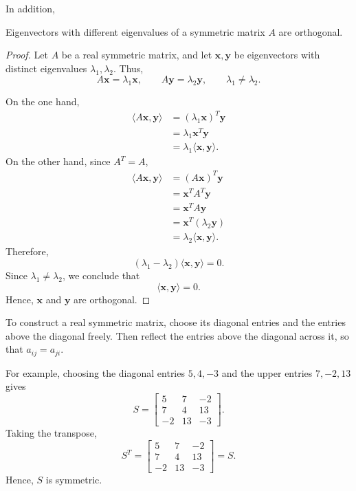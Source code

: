 In addition,

\begin{theorem}
	Eigenvectors with different eigenvalues of a symmetric matrix \( A \) are orthogonal.
\end{theorem}
\begin{proof}
	Let \(A\) be a real symmetric matrix, and let
	\(\mathbf{x},\mathbf{y}\) be eigenvectors with
	distinct eigenvalues \(\lambda_1,\lambda_2\).
	Thus,
	\[
		A\mathbf{x}=\lambda_1\mathbf{x},
		\qquad
		A\mathbf{y}=\lambda_2\mathbf{y},
		\qquad
		\lambda_1\neq\lambda_2.
	\]

	On the one hand,
	\begin{align*}
		\langle A\mathbf{x},\mathbf{y}\rangle
		 & =(\lambda_1\mathbf{x})^T\mathbf{y}             \\
		 & =\lambda_1\mathbf{x}^T\mathbf{y}               \\
		 & =\lambda_1\langle\mathbf{x},\mathbf{y}\rangle.
	\end{align*}
	On the other hand, since \(A^T=A\),
	\begin{align*}
		\langle A\mathbf{x},\mathbf{y}\rangle
		 & =(A\mathbf{x})^T\mathbf{y}                     \\
		 & =\mathbf{x}^TA^T\mathbf{y}                     \\
		 & =\mathbf{x}^TA\mathbf{y}                       \\
		 & =\mathbf{x}^T(\lambda_2\mathbf{y})             \\
		 & =\lambda_2\langle\mathbf{x},\mathbf{y}\rangle.
	\end{align*}
	Therefore,
	\[
		(\lambda_1-\lambda_2)
		\langle\mathbf{x},\mathbf{y}\rangle=0.
	\]
	Since \(\lambda_1\neq\lambda_2\), we conclude that
	\[
		\langle\mathbf{x},\mathbf{y}\rangle=0.
	\]
	Hence, \(\mathbf{x}\) and \(\mathbf{y}\)
	are orthogonal.
\end{proof}

\begin{example}
	To construct a real symmetric matrix, choose
	its diagonal entries and the entries above
	the diagonal freely. Then reflect the entries
	above the diagonal across it, so that
	\(a_{ij}=a_{ji}\).

	For example, choosing the diagonal entries
	\(5,4,-3\) and the upper entries \(7,-2,13\)
	gives
	\[
		S=
		\begin{bmatrix}
			5  & 7  & -2 \\
			7  & 4  & 13 \\
			-2 & 13 & -3
		\end{bmatrix}.
	\]
	Taking the transpose,
	\[
		S^T=
		\begin{bmatrix}
			5  & 7  & -2 \\
			7  & 4  & 13 \\
			-2 & 13 & -3
		\end{bmatrix}
		=S.
	\]
	Hence, \(S\) is symmetric.
\end{example}

